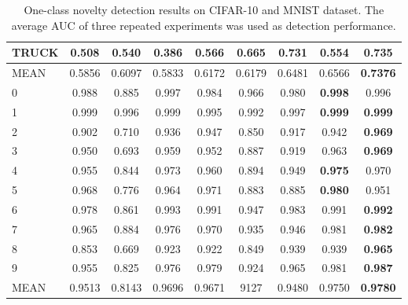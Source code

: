 \documentclass{article}
\begin{document}
\begin{table}
{\begin{tabular}{l|cccccccc}
				TRUCK       & 0.508  & 0.540  & 0.386  & 0.566  & 0.665  & 0.731  & 0.554  & \textbf{0.735} \\	
				\hline
				MEAN        & 0.5856 & 0.6097 & 0.5833 & 0.6172 & 0.6179 & 0.6481 & 0.6566 & \textbf{0.7376} \\
				\hline
				
				0           & 0.988  & 0.885  & 0.997  & 0.984  & 0.966  & 0.980  & \textbf{0.998}  & 0.996 \\
				
				1           & 0.999  & 0.996  & 0.999  & 0.995  & 0.992  & 0.997  & \textbf{0.999}  & \textbf{0.999} \\  
				
				2           & 0.902  & 0.710  & 0.936  & 0.947  & 0.850  & 0.917  & 0.942  & \textbf{0.969} \\
				
				3           & 0.950  & 0.693  & 0.959  & 0.952  & 0.887  & 0.919  & 0.963  & \textbf{0.969} \\
				
				4           & 0.955  & 0.844  & 0.973  & 0.960  & 0.894  & 0.949  & \textbf{0.975}  & 0.970 \\
				
				5           & 0.968  & 0.776  & 0.964  & 0.971  & 0.883  & 0.885  & \textbf{0.980}  & 0.951 \\
				
				6           & 0.978  & 0.861  & 0.993  & 0.991  & 0.947  & 0.983  & 0.991  & \textbf{0.992} \\
				
				7           & 0.965  & 0.884  & 0.976  & 0.970  & 0.935  & 0.946  & 0.981  & \textbf{0.982} \\
				
				8           & 0.853  & 0.669  & 0.923  & 0.922  & 0.849  & 0.939  & 0.939  & \textbf{0.965} \\
				
				9           & 0.955  & 0.825  & 0.976  & 0.979  & 0.924  & 0.965  & 0.981  & \textbf{0.987} \\	
				\hline
				MEAN        & 0.9513 & 0.8143 & 0.9696 & 0.9671 & 9127   & 0.9480 & 0.9750 & \textbf{0.9780}  \\
				\hline
		\end{tabular}}
		\caption{One-class novelty detection results on CIFAR-10 and MNIST dataset. The average AUC of three repeated experiments was used as detection performance.}\label{tab:Results}
	\end{table}
	
\end{document}
